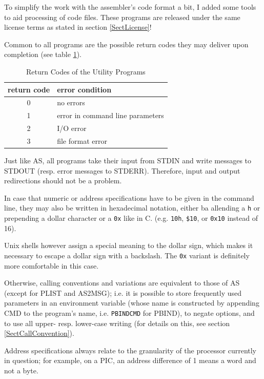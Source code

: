 \documentclass[12pt,twoside]{report}
\newcommand{\tty}[1]{{\tt #1}}
\newcommand{\asname}{{AS}}
\begin{document}
To simplify the work with the assembler's code format a bit, I added
some tools to aid processing of code files.  These programs are
released under the same license terms as stated in section
\ref{SectLicense}!

Common to all programs are the possible return codes they may deliver
upon completion (see table \ref{TabToolReturns}).
\par
\begin{table}[h]
\begin{center}\begin{tabular}{|c|l|}
\hline
return code   & error condition \\
\hline
\hline
0             & no errors \\
1             & error in command line parameters \\
2             & I/O error \\
3             & file format error \\
\hline
\end{tabular}\end{center}
\caption{Return Codes of the Utility Programs\label{TabToolReturns}}
\end{table}
Just like \asname{}, all programs take their input from STDIN and write
messages to STDOUT (resp. error messages to STDERR).  Therefore,
input and output redirections should not be a problem.

In case that numeric or address specifications have to be given in
the command line, they may also be written in hexadecimal
notation,  either ba allending a \verb!h! or prepending a dollar
character or a \tty{0x} like in C.
(e.g. \verb!10h!, \verb!$10!, or \verb!0x10! instead of 16).

Unix shells however  assign a special meaning to the
dollar sign, which makes it necessary to escape a dollar sign with a
backslash.  The \tty{0x} variant is definitely more comfortable in this case.

Otherwise, calling conventions and variations are equivalent to those
of \asname{} (except for PLIST and AS2MSG); i.e. it is possible to store
frequently used parameters in an environment variable (whose name is
constructed by appending CMD to the program's name, i.e. \tty{PBINDCMD} for
PBIND), to negate options, and to use all upper- resp. lower-case
writing (for details on this, see section \ref{SectCallConvention}).

Address specifications always relate to the granularity of the
processor currently in question; for example, on a PIC, an address
difference of 1 means a word and not a byte.
\end{document}
